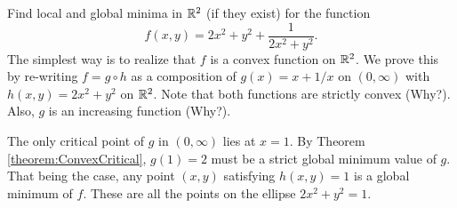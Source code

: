 \begin{example}
Find local and global minima in $\mathbb{R}^2$ (if they exist) for the function
\begin{equation*}
f(x,y) = 2x^2+y^2 + \frac{1}{2x^2+y^2}.
\end{equation*}
The simplest way is to realize that $f$ is a convex function on $\mathbb{R}^2$.  We prove this by re-writing $f=g\circ h$ as a composition of $g(x) = x+1/x$ on $(0,\infty)$ with $h(x,y) = 2x^2+y^2$ on $\mathbb{R}^2$.  Note that both functions are strictly convex (Why?).  Also, $g$ is an increasing function (Why?).

The only critical point of $g$ in $(0,\infty)$ lies at $x=1$.  By Theorem \ref{theorem:ConvexCritical}, $g(1)=2$ must be a strict global minimum value of $g$.  That being the case, any point $(x,y)$ satisfying $h(x,y)=1$ is a global minimum of $f$.  These are all the points on the ellipse $2x^2+y^2=1$. 
\end{example}